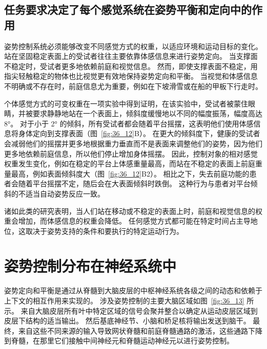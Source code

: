 \subsection{任务要求决定了每个感觉系统在姿势平衡和定向中的作用}

姿势控制系统必须能够改变不同感觉方式的权重，以适应环境和运动目标的变化。
站在坚固稳定表面上的受试者往往主要依靠体感信息来进行姿势定向。
当支撑面不稳定时，受试者更多地依赖前庭和视觉信息。
然而，即使支撑表面不稳定，用指尖轻触稳定的物体也比视觉更有效地保持姿势定向和平衡。
当视觉和体感信息不明确或不存在时，前庭信息尤为重要，例如在下坡滑雪或在船的甲板下行走时。


个体感觉方式的可变权重在一项实验中得到证明，在该实验中，受试者被蒙住眼睛，并被要求静静地站在一个表面上，倾斜度缓慢地以不同的幅度振荡，幅度高达 8°。
对于小于 2° 的倾斜，所有受试者都会随着平台摇摆，这表明他们使用体感信息将身体定向到支撑表面（图~\ref{fig:36_12}B）。 
在更大的倾斜度下，健康的受试者会减弱他们的摇摆并更多地根据重力垂直而不是表面来调整他们的姿势，因为他们更多地依赖前庭信息，所以他们停止增加身体摇摆。
因此，控制对象的相对感觉权重发生变化，例如在稳定的平台上体感重量最高，而站在不稳定的表面上前庭重量最高，例如表面倾斜度大（图~\ref{fig:36_12}B2）。
相比之下，失去前庭功能的患者会随着平台摇摆不定，随后会在大表面倾斜时跌倒。
这种行为与患者对平台倾斜的不适当自动姿势反应一致。


诸如此类的研究表明，当人们站在移动或不稳定的表面上时，前庭和视觉信息的权重会增加，而体感信息的权重会降低。
任何感觉方式都可能在特定时间占主导地位，这取决于姿势支持的条件和要执行的特定运动行为。



\section{姿势控制分布在神经系统中}

姿势定向和平衡是通过从脊髓到大脑皮层的中枢神经系统各级之间的动态和依赖于上下文的相互作用来实现的。
涉及姿势控制的主要大脑区域如图~\ref{fig:36_13} 所示。
来自大脑皮层所有叶中特定区域的信号会聚并整合以确定从运动皮层区域到皮层下结构的适当输出。
然后基底神经节、小脑和桥足核将输出发送到脑干。
最终，来自这些不同来源的输入导致网状脊髓和前庭脊髓通路的激活，这些通路下降到脊髓，在那里它们接触中间神经元和脊髓运动神经元以进行姿势控制。


